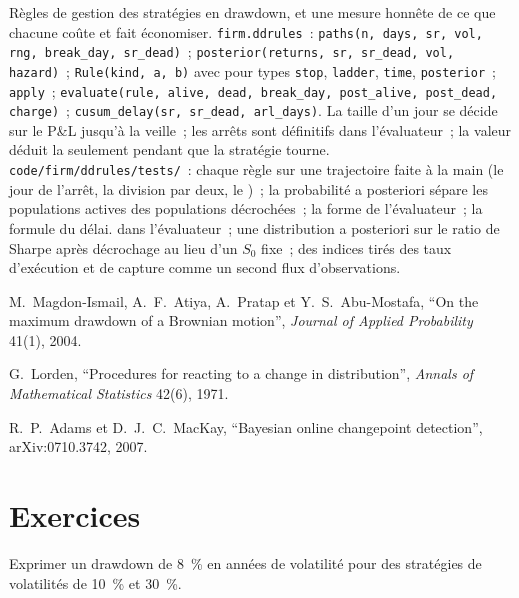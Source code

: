 \begin{build}
 Règles de gestion des stratégies en drawdown, et une mesure honnête de ce que chacune coûte et fait économiser.
 \texttt{firm.ddrules}~: \texttt{paths(n, days, sr, vol, rng, break\_day, sr\_dead)}~;
\texttt{posterior(returns, sr, sr\_dead, vol, hazard)}~; \texttt{Rule(kind, a, b)} avec pour types \texttt{stop}, \texttt{ladder}, \texttt{time}, \texttt{posterior}~; \texttt{apply}~;
\texttt{evaluate(rule, alive, dead, break\_day, post\_alive, post\_dead, charge)}~; \texttt{cusum\_delay(sr, sr\_dead, arl\_days)}.
 La taille d'un jour se décide sur le P\&L jusqu'à la veille~; les arrêts sont définitifs dans l'évaluateur~; la valeur déduit la 
seulement pendant que la stratégie tourne.
 \texttt{code/firm/ddrules/tests/}~: chaque règle sur une trajectoire faite à la main (le jour de l'arrêt, la division par deux, le )~; la
probabilité a posteriori sépare les populations actives des populations décrochées~; la forme de l'évaluateur~; la formule du délai.
  dans l'évaluateur~; une distribution a posteriori sur le ratio de Sharpe après décrochage au lieu d'un $S_0$ fixe~; des indices tirés des taux d'exécution
et de capture comme un second flux d'observations.
\end{build}

\begin{omsources}
\item M.~Magdon-Ismail, A.~F.~Atiya, A.~Pratap et Y.~S.~Abu-Mostafa, ``On the maximum drawdown of a Brownian motion'', \emph{Journal of
Applied Probability} 41(1), 2004.
\item G.~Lorden, ``Procedures for reacting to a change in distribution'', \emph{Annals of Mathematical Statistics} 42(6), 1971.
\item R.~P.~Adams et D.~J.~C.~MacKay, ``Bayesian online changepoint detection'', arXiv:0710.3742, 2007.
\end{omsources}

\section{Exercices}

\begin{exercise}[$\star$]\label{exo:fm:managing-a-book-through-drawdown:1}
Exprimer un drawdown de 8~\% en années de volatilité pour des stratégies de volatilités de 10~\% et 30~\%.
\end{exercise}

